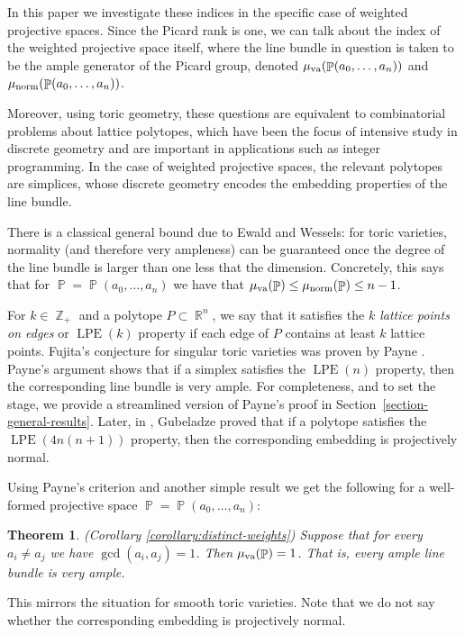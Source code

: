 \documentclass[a4paper,11pt]{amsart}
\theoremstyle{plain}
\newtheorem{theorem}{Theorem}[section]
\theoremstyle{definition}
\theoremstyle{remark}
\DeclareMathOperator{\ZZ}{\mathbb{Z}}
\DeclareMathOperator{\RR}{\mathbb{R}}
\DeclareMathOperator{\PP}{\mathbb{P}}
\DeclareMathOperator{\LPE}{LPE}
\DeclareMathOperator{\munorm}{\mu_{\text norm}}
\DeclareMathOperator{\muva}{\mu_{\text va}}
\begin{document}
In this paper we investigate these indices in the specific case of weighted projective spaces.
Since the Picard rank is one, we can talk about the index of the weighted projective space itself, where the line bundle in question is taken to be the ample generator of the Picard group, denoted $\muva(\PP(a_0, \dots , a_n))$ and $\munorm(\PP(a_0, \dots , a_n))$.

Moreover, using toric geometry, these questions are equivalent to combinatorial problems about lattice polytopes, which have been the focus of intensive study in discrete geometry and are important in applications such as integer programming.
In the case of weighted projective spaces, the relevant polytopes are simplices, whose discrete geometry encodes the embedding properties of the line bundle.

There is a classical general bound due to Ewald and Wessels: for toric varieties, normality (and therefore very ampleness) can be guaranteed once the degree of the line bundle is larger than one less that the dimension.
Concretely, this says that for $\PP = \PP(a_0, \dots , a_n)$ we have that $\muva(\PP) \leq \munorm(\PP) \leq n-1$.

For $k \in \ZZ_+$ and a polytope $P \subset \RR^n$, we say that it satisfies the \emph{$\mathit{k}$ lattice points on edges} or $\LPE(k)$ property if each edge of $P$ contains at least $k$ lattice points.
Fujita’s conjecture for singular toric varieties was proven by Payne \cite{Payne:2006}. Payne’s argument shows that if a simplex satisfies the $\LPE(n)$ property, then the corresponding line bundle is very ample.
For completeness, and to set the stage, we provide a streamlined version of Payne’s proof in Section~\ref{section-general-results}.
Later, in \cite{Gubeladze:2012}, Gubeladze proved that if a polytope satisfies the $\LPE(4n(n+ 1))$ property, then the corresponding embedding is projectively normal.

Using Payne's criterion and another simple result we get the following for a well-formed projective space $\PP = \PP(a_0,\dots , a_n)$:

\begin{theorem}(Corollary \ref{corollary:distinct-weights})
    Suppose that for every $a_i \neq a_j$ we have $\gcd(a_i,a_j)=1$.
    Then $\muva(\PP) = 1$.
    That is, every ample line bundle is very ample.
\end{theorem}

This mirrors the situation for smooth toric varieties.
Note that we do not say whether the corresponding embedding is projectively normal.
\end{document}
